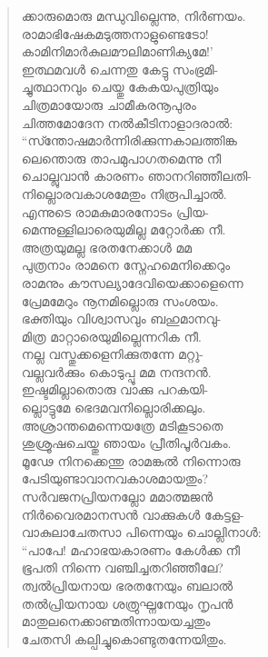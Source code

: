 \begin{verse}
ക്കാരുമൊരു മന്ധുവില്ലെന്നു, നിര്‍ണയം.\\
രാമാഭിഷേകമടുത്തനാളുണ്ടെടോ!\\
കാമിനിമാര്‍കുലമൗലിമാണിക്യമേ!’\\
ഇത്ഥമവള്‍ ചെന്നതു കേട്ടു സംഭ്രമി-\\
ച്ചുത്ഥാനവും ചെയ്തു കേകയപുത്രിയും\\
ചിത്രമായോരു ചാമീകരനൂപുരം\\
ചിത്തമോദേന നല്‍കീടിനാളാദരാല്‍:\\
“സ്ന്തോഷമാര്‍ന്നിരിക്കുന്നകാലത്തിങ്ക\\
ലെന്തൊരു താപമുപാഗതമെന്നു നീ\\
ചൊല്ലുവാന്‍ കാരണം ഞാനറിഞ്ഞീലതി-\\
നില്ലൊരവകാശമേതും നിരൂപിച്ചാല്‍.\\
എന്നുടെ രാമകുമാരനോടം പ്രിയ-\\
മെന്നുള്ളിലാരെയുമില്ല മറ്റോര്‍ക്ക നീ.\\
അത്രയുമല്ല ഭരതനേക്കാള്‍ മമ\\
പുത്രനാം രാമനെ സ്നേഹമെനിക്കെറും\\
രാമനും കൗസല്യാദേവിയെക്കാളെന്നെ\\
പ്രേമമേറും നൂനമില്ലൊരു സംശയം.\\
ഭക്തിയും വിശ്വാസവും ബഹുമാനവു-\\
മിത്ര മാറ്റാരെയുമില്ലെന്നറിക നീ.\\
നല്ല വസ്തുക്കളെനിക്കുതന്നേ മറ്റു-\\
വല്ലവര്‍ക്കും കൊടുപ്പൂ മമ നന്ദനന്‍.\\
ഇഷ്ടമില്ലാതൊരു വാക്കു പറകയി-\\
ല്ലൊട്ടുമേ ഭെദമവനില്ലൊരിക്കലും.\\
അശ്രാന്തമെന്നെയത്രേ മടികൂടാതെ\\
ശുശ്രൂഷചെയ്തു ഞായം പ്രീതിപൂര്‍വകം.\\
മൂഢേ നിനക്കെന്തു രാമങ്കല്‍ നിന്നൊരു\\
പേടിയുണ്ടാവാനവകാശമായതും?\\
സര്‍വജനപ്രിയനല്ലോ മമാത്മജന്‍\\
നിര്‍വൈരമാനസന്‍ വാക്കുകള്‍ കേട്ടള-\\
വാകുലാചേതസാ പിന്നെയും ചൊല്ലിനാള്‍:\\
“പാപേ! മഹാഭയകാരണം കേള്‍ക്ക നീ\\
ഭൂപതി നിന്നെ വഞ്ചിച്ചതറിഞ്ഞീലേ?\\
ത്വല്‍പ്രിയനായ ഭരതനേയും ബലാല്‍\\
തല്‍പ്രിയനായ ശത്രുഘ്നനേയും നൃപന്‍\\
മാതുലനെക്കാണ്മതിന്നായയച്ചതും\\
ചേതസി കല്പിച്ചുകൊണ്ടുതന്നേയിതും.\\

\end{verse}
